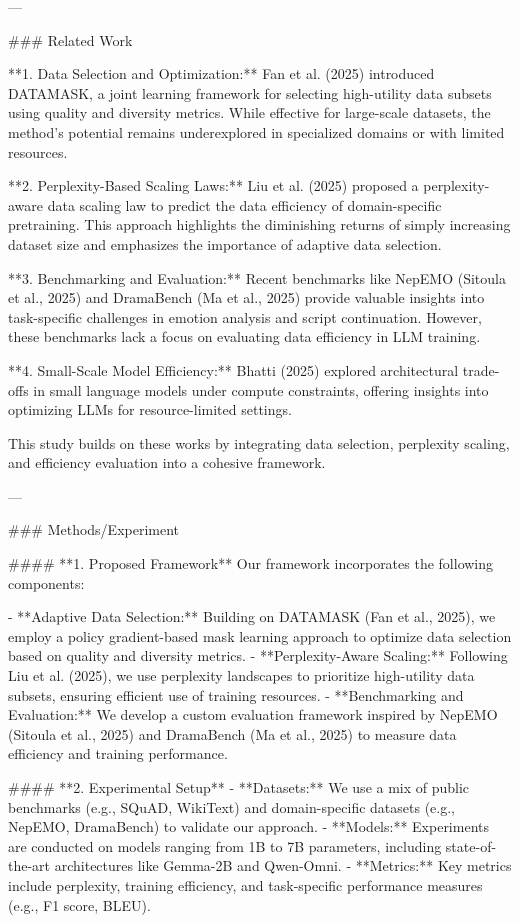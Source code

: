 ---

### Related Work  

**1. Data Selection and Optimization:**  
Fan et al. (2025) introduced DATAMASK, a joint learning framework for selecting high-utility data subsets using quality and diversity metrics. While effective for large-scale datasets, the method's potential remains underexplored in specialized domains or with limited resources.  

**2. Perplexity-Based Scaling Laws:**  
Liu et al. (2025) proposed a perplexity-aware data scaling law to predict the data efficiency of domain-specific pretraining. This approach highlights the diminishing returns of simply increasing dataset size and emphasizes the importance of adaptive data selection.  

**3. Benchmarking and Evaluation:**  
Recent benchmarks like NepEMO (Sitoula et al., 2025) and DramaBench (Ma et al., 2025) provide valuable insights into task-specific challenges in emotion analysis and script continuation. However, these benchmarks lack a focus on evaluating data efficiency in LLM training.  

**4. Small-Scale Model Efficiency:**  
Bhatti (2025) explored architectural trade-offs in small language models under compute constraints, offering insights into optimizing LLMs for resource-limited settings.  

This study builds on these works by integrating data selection, perplexity scaling, and efficiency evaluation into a cohesive framework.

---

### Methods/Experiment  

#### **1. Proposed Framework**  
Our framework incorporates the following components:  

- **Adaptive Data Selection:** Building on DATAMASK (Fan et al., 2025), we employ a policy gradient-based mask learning approach to optimize data selection based on quality and diversity metrics.  
- **Perplexity-Aware Scaling:** Following Liu et al. (2025), we use perplexity landscapes to prioritize high-utility data subsets, ensuring efficient use of training resources.  
- **Benchmarking and Evaluation:** We develop a custom evaluation framework inspired by NepEMO (Sitoula et al., 2025) and DramaBench (Ma et al., 2025) to measure data efficiency and training performance.  

#### **2. Experimental Setup**  
- **Datasets:** We use a mix of public benchmarks (e.g., SQuAD, WikiText) and domain-specific datasets (e.g., NepEMO, DramaBench) to validate our approach.  
- **Models:** Experiments are conducted on models ranging from 1B to 7B parameters, including state-of-the-art architectures like Gemma-2B and Qwen-Omni.  
- **Metrics:** Key metrics include perplexity, training efficiency, and task-specific performance measures (e.g., F1 score, BLEU).  

